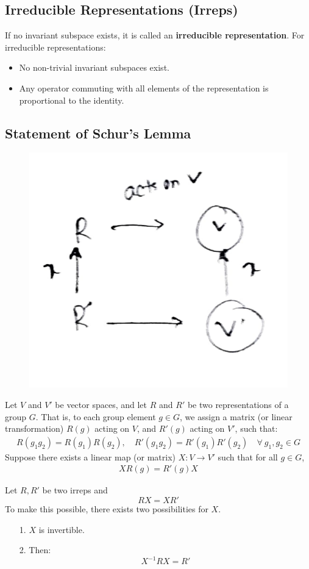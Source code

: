 \documentclass[14pt]{article} %
\begin{document}
\subsection*{Irreducible Representations (Irreps)}
If no invariant subspace exists, it is called an \textbf{irreducible representation}. For irreducible representations:
\begin{itemize}
    \item No non-trivial invariant subspaces exist.
    \item Any operator commuting with all elements of the representation is proportional to the identity.
\end{itemize}
\subsection*{Statement of Schur's Lemma}
\vspace{-0.5cm}
\begin{figure}[H]
\centering
\includegraphics[width=0.3\linewidth]{figures/L2_4.jpg}
\caption*{}
\end{figure}
\vspace{-2cm}
Let $V$ and $V'$ be vector spaces, and let $R$ and $R'$ be two representations of a group $G$. That is, to each group element $g \in G$, we assign a matrix (or linear transformation) $R(g)$ acting on $V$, and $R'(g)$ acting on $V'$, such that:
\begin{align*}
R(g_1 g_2) = R(g_1) R(g_2), \quad R'(g_1 g_2) = R'(g_1) R'(g_2) \quad \forall~ g_1, g_2 \in G
\end{align*}
Suppose there exists a linear map (or matrix) $X: V \to V'$ such that for all $g \in G$,
\begin{align*}
X R(g) = R'(g) X
\end{align*}
\begin{tcolorbox}[ title=Intertwiner]
Let $R, R'$ be two irreps and 
$$RX = XR'$$ 
To make this possible, there exists two possibilities for $X$.
\begin{itemize}
    \item[1.] $X$ is invertible.
    \item[2.] Then: $$X^{-1} R X = R'$$
\end{itemize}
\end{tcolorbox}
\end{document}
